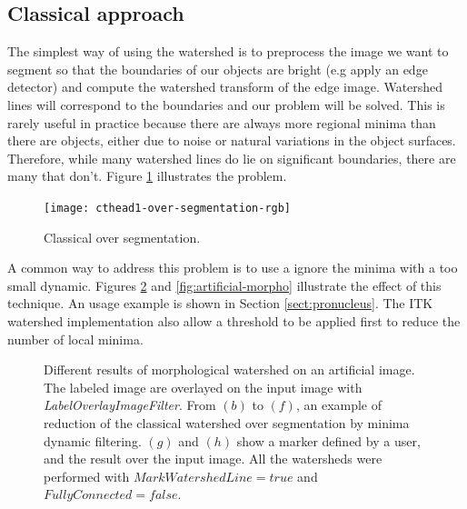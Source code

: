 \documentclass{InsightArticle}
\begin{document}
\subsection{Classical approach}
The simplest way of using the watershed is to preprocess the image we
want to segment so that the boundaries of our objects are bright (e.g
apply an edge detector) and compute the watershed transform of the
edge image. Watershed lines will correspond to the boundaries and our
problem will be solved. This is rarely useful in practice because
there are always more regional minima than there are objects, either
due to noise or natural variations in the object surfaces. Therefore,
while many watershed lines do lie on significant boundaries, there are
many that don't. Figure \ref{fig:overseg} illustrates the problem. 

\begin{figure}
\begin{center}
\texttt{[image: cthead1-over-segmentation-rgb]}
\caption{Classical over segmentation.}
\label{fig:overseg}
\end{center}
\end{figure}

A common way to address this problem is to use a ignore the minima
with a too small dynamic. Figures \ref{fig:artificial-itk} and
\ref{fig:artificial-morpho} illustrate the effect of this technique.
An usage example is shown in Section \ref{sect:pronucleus}.
The ITK watershed implementation also allow a threshold to be applied
first to reduce the number of local minima.

\begin{figure}[htbp]
\begin{center}
\caption{Different results of morphological watershed on an artificial image. The labeled image are overlayed on the input image with {\em LabelOverlayImageFilter}. From $(b)$ to $(f)$, an example of reduction of the classical watershed over segmentation by minima dynamic filtering. $(g)$ and $(h)$ show a marker defined by a user, and the result over the input image. All the watersheds were performed with $MarkWatershedLine = true$ and $FullyConnected = false$.\label{fig:artificial-itk}}
\end{center}
\end{figure}
\end{document}

